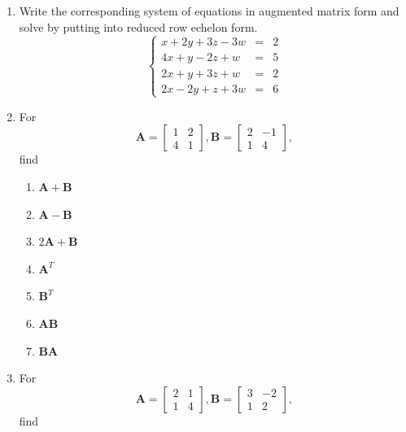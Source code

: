 \documentclass[
]{book}
\providecommand{\tightlist}{%
  \setlength{\itemsep}{0pt}\setlength{\parskip}{0pt}}
\theoremstyle{definition}
\theoremstyle{definition}
\theoremstyle{definition}
\theoremstyle{definition}
\theoremstyle{remark}
\begin{document}
\begin{enumerate}
\[\begin{array}{rrr}
  x+y+z+w&=&2\\
  5x-y+3z+2w&=&7
  \end{array}\right.
  \]
\item
  Write the corresponding system of equations in augmented matrix form and solve by putting into reduced row echelon form.
  \[
  \left\{
  \begin{array}{rrr}
  x+2y+3z-3w&=& 2\\
  4x+y-2z+w&=&5\\
  2x+y+3z+w&=&2\\
  2x-2y+z+3w&=&6
  \end{array}\right.
  \]
\item
  For
  \[\mathbf{A}=\begin{bmatrix}1 & 2\\4& 1\end{bmatrix},\mathbf{B}=\begin{bmatrix}2 & -1\\1 & 4\end{bmatrix},\]
  find

  \begin{enumerate}
  \def\labelenumii{\alph{enumii}.}
  \tightlist
  \item
    \(\mathbf{A}+\mathbf{B}\)
  \item
    \(\mathbf{A}-\mathbf{B}\)
  \item
    \(2\mathbf{A}+\mathbf{B}\)
  \item
    \(\mathbf{A}^T\)
  \item
    \(\mathbf{B}^T\)
  \item
    \(\mathbf{A}\mathbf{B}\)
  \item
    \(\mathbf{B}\mathbf{A}\)
  \end{enumerate}
\item
  For
  \[\mathbf{A}=\begin{bmatrix}2 & 1\\1& 4\end{bmatrix},\mathbf{B}=\begin{bmatrix}3 & -2\\1 & 2\end{bmatrix},\]
  find


\end{enumerate}
\end{document}
